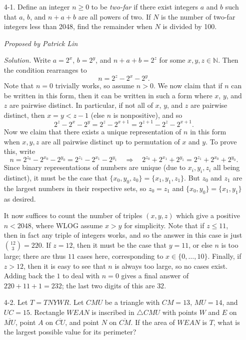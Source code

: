 \documentclass[10pt]{article}
\newcommand{\proposed}[1]
{
\vspace{5pt}
\noindent\textit{Proposed by #1}
}
\newcommand{\solution}
{
\vspace{5pt}
\noindent\textit{Solution.}\qquad
}
\begin{document}
\begin{enumerate}
\item[4-1.] Define an integer $n \ge 0$ to be \textit{two-far} if there exist integers $a$ and $b$ such that $a$, $b$, and $n + a + b$ are all powers of two. If $N$ is the number of two-far integers less than 2048, find the remainder when $N$ is divided by 100.

\proposed{Patrick Lin}

\solution Write $a = 2^x$, $b = 2^y$, and $n + a + b = 2^z$ for some $x,y,z\in\mathbb N$.  Then the condition rearranges to \[n = 2^z - 2^x - 2^y.\] Note that $n=0$ trivially works, so assume $n>0$.  We now claim that if $n$ can be written in this form, then it can be written in such a form where $x$, $y$, and $z$ are pairwise distinct.  In particular, if not all of $x$, $y$, and $z$ are pairwise distinct, then $x = y < z-1$ (else $n$ is nonpositive), and so \[2^z - 2^x - 2^y = 2^z - 2^{x+1} = 2^{z+1} - 2^z - 2^{x+1}.\] Now we claim that there exists a unique representation of $n$ in this form when $x,y,z$ are all pairwise distinct up to permutation of $x$ and $y$.  To prove this, write \[n = 2^{z_0} - 2^{x_0} - 2^{y_0} = 2^{z_1} - 2^{x_1} - 2^{y_1}\quad\Rightarrow\quad 2^{z_0} + 2^{x_1} + 2^{y_1} = 2^{z_1} + 2^{x_0} + 2^{y_0}.\] Since binary representations of numbers are unique (due to $x_i,y_i,z_i$ all being distinct), it must be the case that $\{x_0,y_0,z_0\} = \{x_1,y_1,z_1\}$.  But $z_0$ and $z_1$ are the largest numbers in their respective sets, so $z_0 = z_1$ and $\{x_0,y_0\} = \{x_1,y_1\}$ as desired.

\par It now suffices to count the number of triples $(x,y,z)$ which give a positive $n < 2048$, where WLOG assume $x>y$ for simplicity.  Note that if $z \leq 11$, then in fact any triple of integers works, and so the answer in this case is just $\binom{12}3 = 220$.  If $z = 12$, then it must be the case that $y = 11$, or else $n$ is too large; there are thus $11$ cases here, corresponding to $x\in\{0,\ldots, 10\}$.  Finally, if $z > 12$, then it is easy to see that $n$ is always too large, so no cases exist.  Adding back the $1$ to deal with $n=0$ gives a final answer of $220 + 11 + 1 = 232$; the last two digits of this are $\boxed{32}$.


\item[4-2.] Let $T = TNYWR$. Let $CMU$ be a triangle with $CM=13$, $MU=14$, and $UC=15$.  Rectangle $WEAN$ is inscribed in $\triangle CMU$ with points $W$ and $E$ on $\overline{MU}$, point $A$ on $\overline{CU}$, and point $N$ on $\overline{CM}$.  If the area of $WEAN$ is $T$, what is the largest possible value for its perimeter?


\end{enumerate}
\end{document}
